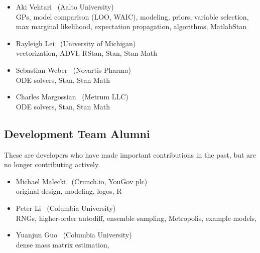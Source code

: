 \begin{itemize}
\item Aki Vehtari \ (Aalto University) \\ {\footnotesize GPs, model
    comparison (LOO, WAIC), modeling, priors, variable selection, max
    marginal likelihood, expectation propagation, algorithms,
    MatlabStan}
\item Rayleigh Lei \ (University of Michigan)
\\ {\footnotesize vectorization, ADVI, RStan, Stan, Stan Math}
\item Sebastian Weber \ (Novartis Pharma)
\\ {\footnotesize ODE solvers, Stan, Stan Math}
\item Charles Margossian \ (Metrum LLC)
\\ {\footnotesize ODE solvers, Stan, Stan Math}
\end{itemize}

\subsection*{Development Team Alumni}

These are developers who have made important contributions in the
past, but are no longer contributing actively.

\begin{itemize}
\item Michael Malecki \ (Crunch.io, YouGov plc)
\\ {\footnotesize original design, modeling, logos, R}
\item Peter Li \   (Columbia University)
\\ {\footnotesize RNGs, higher-order autodiff, ensemble sampling,
  Metropolis, example models, \Cpp}
\item Yuanjun Guo \ (Columbia University)
\\ {\footnotesize dense mass matrix estimation, \Cpp}
\end{itemize}

